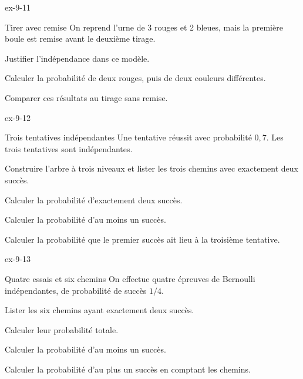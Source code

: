 \begin{blocLivre}{ex-9-11}
\begin{exercice}[2]{Tirer avec remise}
On reprend l’urne de 3 rouges et 2 bleues, mais la première boule est remise avant le deuxième tirage.\begin{questions}
\item Justifier l’indépendance dans ce modèle.
\item Calculer la probabilité de deux rouges, puis de deux couleurs différentes.
\item Comparer ces résultats au tirage sans remise.
\end{questions}
\label{figlivre-r09-11-ex}

\end{exercice}
\end{blocLivre}
\clearpage
{}
\begin{blocLivre}{ex-9-12}
\begin{exercice}[3]{Trois tentatives indépendantes}
Une tentative réussit avec probabilité $0{,}7$. Les trois tentatives sont indépendantes.\begin{questions}
\item Construire l’arbre à trois niveaux et lister les trois chemins avec exactement deux succès.
\item Calculer la probabilité d’exactement deux succès.
\item Calculer la probabilité d’au moins un succès.
\item Calculer la probabilité que le premier succès ait lieu à la troisième tentative.
\end{questions}
\label{figlivre-r09-12-ex}

\end{exercice}
\end{blocLivre}
\begin{blocLivre}{ex-9-13}
\begin{exercice}[3]{Quatre essais et six chemins}
On effectue quatre épreuves de Bernoulli indépendantes, de probabilité de succès $1/4$.\begin{questions}
\item Lister les six chemins ayant exactement deux succès.
\item Calculer leur probabilité totale.
\item Calculer la probabilité d’au moins un succès.
\item Calculer la probabilité d’au plus un succès en comptant les chemins.
\end{questions}
\label{figlivre-r09-13-ex}

\end{exercice}
\end{blocLivre}
